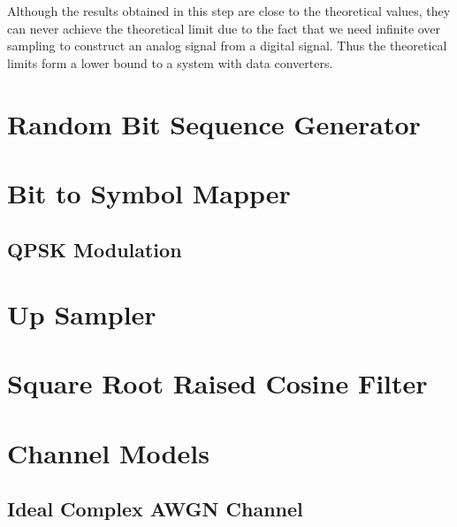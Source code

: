 \documentclass[]{article}
\begin{document}
Although the results obtained in this step are close to the theoretical values, they can never achieve the theoretical limit due to the fact that we need infinite over sampling to construct an analog signal from a digital signal. Thus the theoretical limits form a lower bound to a system with data converters. 

\appendix
\newpage


\newpage
%

\section{Random Bit Sequence Generator}
\label{app:random_bit_generator}


\section{Bit to Symbol Mapper}
\label{app:bittosym}

\subsection{QPSK Modulation}
\label{app:qpsk_mod}


\section{Up Sampler}
\label{app:impulse_train}


\section{Square Root Raised Cosine Filter}
\label{app:sqrt_raised_cosine}


\section{Channel Models}
\subsection{Ideal Complex AWGN Channel}
\label{app:awgn_channel}

\end{document}
